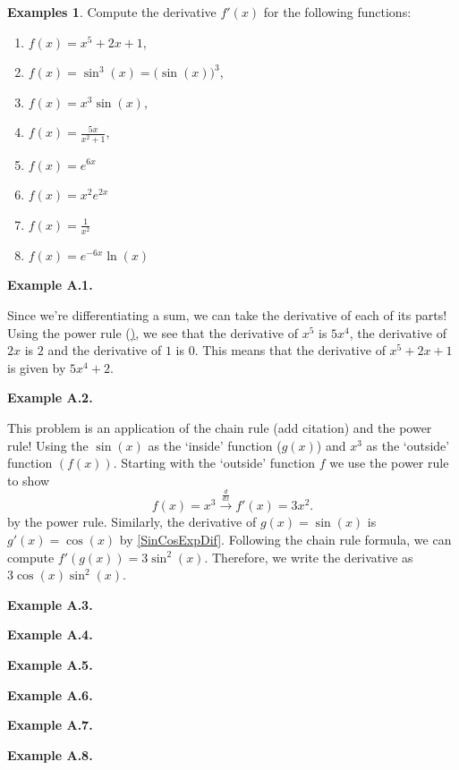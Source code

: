\documentclass[12pt]{article}
\newcommand{\diff}[2]{\frac{d #1}{d #2} }
\theoremstyle{definition}
\newtheorem{exmps}[thm]{Examples}
\theoremstyle{plain}
\numberwithin{equation}{section}
\begin{document}
\begin{exmps}

Compute the derivative $f'(x)$ for the following functions:
\begin{enumerate}[label=\textbf{Example A.\arabic*.}]
  \addtolength{\itemindent}{2.5cm} %
  \item \label{DifEA1} $f(x) = x^5+2x+1$,
  \item \label{DifEA2} $f(x) = \sin^3(x)=\big(\sin(x)\big)^3$,
  \item \label{DifEA3} $f(x) = x^3\sin(x)$,
  \item \label{DifEA4} $f(x) =\frac{5x}{x^2+1}$,
  \item \label{DifEA5} $f(x) = e^{6x}$
  \item \label{DifEA6} $f(x) = x^2e^{2x}$
  \item \label{DifEA7} $f(x) = \frac{1}{x^2}$
  \item \label{DifEA8} $f(x) = e^{-6x}\ln(x)$
\end{enumerate}

\textbf{Example A.1.}

Since we're differentiating a sum, we can take the derivative of each of its parts! Using the power rule (\href{PowRule}), we see that the derivative of $x^5$ is $5x^4$, the derivative of $2x$ is $2$ and the derivative of $1$ is 0. This means that the derivative of $x^5 + 2x + 1$ is given by $5x^4 + 2$.

\textbf{Example A.2.}

This problem is an application of the chain rule (add citation) and the power rule! Using the $\sin(x)$ as the `inside' function ($g(x)$) and $x^3$ as the `outside' function $(f(x))$. Starting with the `outside' function $f$ we use the power rule to show
\[
f(x) = x^3 \xrightarrow{\diff{}{x}} f'(x) = 3x^2.
\] by the power rule. Similarly, the derivative of $g(x) = \sin(x)$ is $g'(x) = \cos(x)$ by \cref{SinCosExpDif}. Following the chain rule formula, we can compute $f'(g(x)) = 3 \sin^2(x)$. Therefore, we write the derivative as $3\cos(x)\sin^2(x)$.

\textbf{Example A.3.}

\textbf{Example A.4.}

\textbf{Example A.5.}

\textbf{Example A.6.}

\textbf{Example A.7.}

\textbf{Example A.8.}

\end{exmps}
\end{document}
